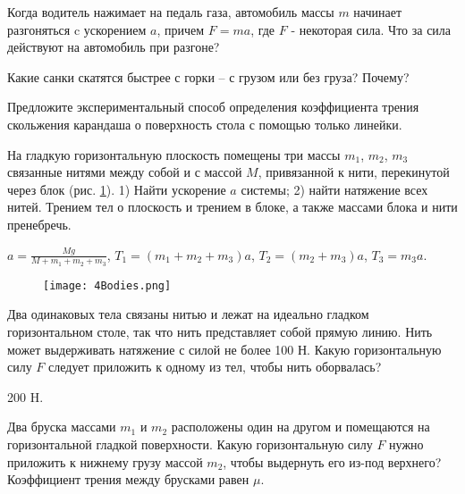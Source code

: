 \begin{ex} %
Когда водитель нажимает на педаль газа, автомобиль массы $m$ начинает разгоняться c ускорением $a$, причем $F = ma$, где $F$ - некоторая сила. Что за сила действуют на автомобиль при разгоне?
\end{ex}

\begin{ex} %
Какие санки скатятся быстрее с горки -- с грузом или без груза? Почему?
\end{ex}

\begin{ex}
Предложите экспериментальный способ определения коэффициента трения скольжения карандаша о поверхность стола с помощью только линейки.
\end{ex}

\simpleProblems

\begin{ex} %
На гладкую горизонтальную плоскость помещены три массы $m_1$, $m_2$, $m_3$ связанные нитями между собой и с массой $M$, привязанной к нити, перекинутой через блок (рис. \ref{4Bodies}). 1) Найти ускорение $a$ системы; 2) найти натяжение всех нитей. Трением тел о плоскость и трением в блоке, а также массами блока и нити пренебречь.
\begin{ans}
$a = \frac{Mg}{M + m_1 +m_2 +m_3}$, $T_1 = (m_1 +m_2 +m_3)a$, $T_2 = (m_2 +m_3)a$, $T_3 = m_3 a$.
\end{ans}
\end{ex}

\begin{figure}[h]
\centering
\texttt{[image: 4Bodies.png]}
\caption{}
\label{4Bodies}
\end{figure}

\begin{ex} %
Два одинаковых тела связаны нитью и лежат на идеально гладком горизонтальном столе, так что нить представляет собой прямую линию. Нить может выдерживать натяжение с силой не более 100 Н. Какую горизонтальную силу $F$ следует приложить к одному из тел, чтобы нить оборвалась?
\begin{ans}
200 H.
\end{ans}
\end{ex}

\begin{ex}
Два бруска массами $m_1$ и $m_2$ расположены один на другом и помещаются на горизонтальной гладкой поверхности. Какую горизонтальную силу $F$ нужно приложить к нижнему грузу массой $m_2$, чтобы выдернуть его из-под верхнего? Коэффициент трения между брусками равен $\mu$.
\end{ex}


